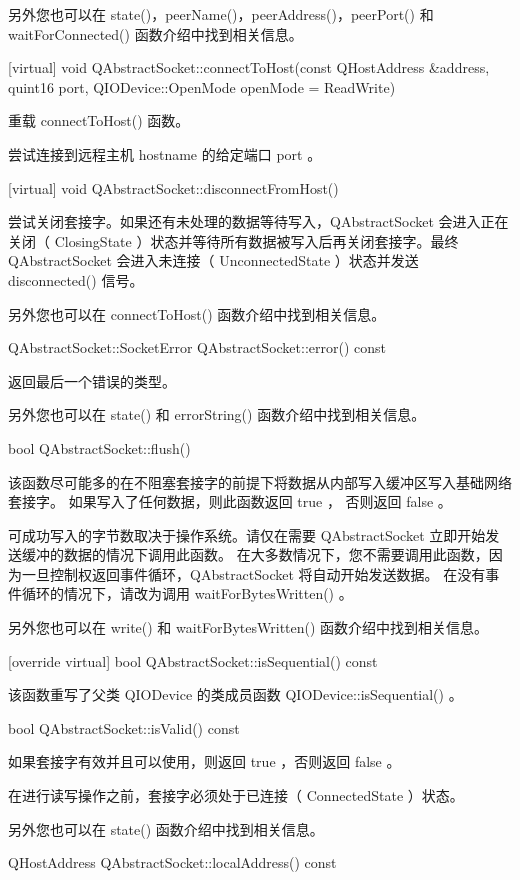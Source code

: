 另外您也可以在 state()，peerName()，peerAddress()，peerPort() 和 waitForConnected() 函数介绍中找到相关信息。

[virtual] void QAbstractSocket::connectToHost(const QHostAddress
\&address, quint16 port, QIODevice::OpenMode openMode = ReadWrite)

重载 connectToHost() 函数。

尝试连接到远程主机 hostname 的给定端口 port 。

[virtual] void QAbstractSocket::disconnectFromHost()

尝试关闭套接字。如果还有未处理的数据等待写入，QAbstractSocket 会进入正在关闭（ ClosingState ）状态并等待所有数据被写入后再关闭套接字。最终 QAbstractSocket 会进入未连接（ UnconnectedState ）状态并发送 disconnected() 信号。

另外您也可以在 connectToHost() 函数介绍中找到相关信息。

QAbstractSocket::SocketError QAbstractSocket::error() const

返回最后一个错误的类型。

另外您也可以在 state() 和 errorString() 函数介绍中找到相关信息。

bool QAbstractSocket::flush()

该函数尽可能多的在不阻塞套接字的前提下将数据从内部写入缓冲区写入基础网络套接字。 如果写入了任何数据，则此函数返回 true ， 否则返回 false 。

可成功写入的字节数取决于操作系统。请仅在需要 QAbstractSocket 立即开始发送缓冲的数据的情况下调用此函数。 在大多数情况下，您不需要调用此函数，因为一旦控制权返回事件循环，QAbstractSocket 将自动开始发送数据。 在没有事件循环的情况下，请改为调用 waitForBytesWritten() 。

另外您也可以在 write() 和 waitForBytesWritten() 函数介绍中找到相关信息。

[override virtual] bool QAbstractSocket::isSequential() const

该函数重写了父类 QIODevice 的类成员函数 QIODevice::isSequential() 。

bool QAbstractSocket::isValid() const

如果套接字有效并且可以使用，则返回 true ，否则返回 false 。


\begin{notice}
在进行读写操作之前，套接字必须处于已连接（ ConnectedState ）状态。
\end{notice}

另外您也可以在 state() 函数介绍中找到相关信息。

QHostAddress QAbstractSocket::localAddress() const

